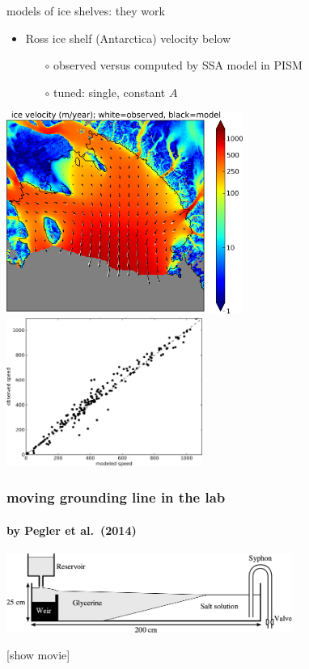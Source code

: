 \documentclass[10pt,hyperref={pdfpagelabels=true}]{beamer}
\begin{document}
\begin{frame}{models of ice shelves: they work}

\begin{itemize}
\item Ross ice shelf (Antarctica) velocity below
  \begin{itemize}
  \item[$\circ$] observed versus computed by SSA model in PISM
  \item[$\circ$] tuned: single, constant $A$
  \end{itemize}
\end{itemize}
\vspace{-0.3in}

\begin{center}
  \mbox{\includegraphics[width=0.58\textwidth]{rossquiver} \, \includegraphics[width=0.48\textwidth]{rossscatter}}
\end{center}
\end{frame}

\begin{frame}
  \frametitle{moving grounding line in the lab}
  \framesubtitle{by Pegler et al.~(2014)}

\begin{center}

\includegraphics[width=0.7\textwidth]{pegler2014-grounding-line-schematic}

\vspace{1.0in}
[show movie]
\end{center}
\end{frame}
\end{document}
